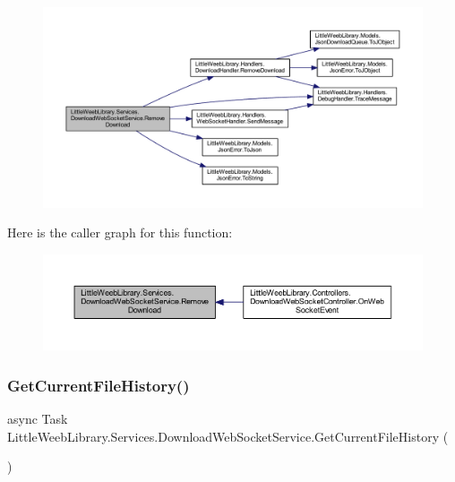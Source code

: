 \begin{figure}[H]
\begin{center}
\leavevmode
\includegraphics[width=350pt]{class_little_weeb_library_1_1_services_1_1_download_web_socket_service_a3bc6b4176561f56b918e75527c7698d0_cgraph}
\end{center}
\end{figure}
Here is the caller graph for this function\+:\nopagebreak
\begin{figure}[H]
\begin{center}
\leavevmode
\includegraphics[width=350pt]{class_little_weeb_library_1_1_services_1_1_download_web_socket_service_a3bc6b4176561f56b918e75527c7698d0_icgraph}
\end{center}
\end{figure}
\mbox{\label{class_little_weeb_library_1_1_services_1_1_download_web_socket_service_adb3b1a3aadf9ad491388890e432f6c91}} 
\subsubsection{\texorpdfstring{Get\+Current\+File\+History()}{GetCurrentFileHistory()}}
{\footnotesize\ttfamily async Task Little\+Weeb\+Library.\+Services.\+Download\+Web\+Socket\+Service.\+Get\+Current\+File\+History (\begin{DoxyParamCaption}{ }\end{DoxyParamCaption})}




